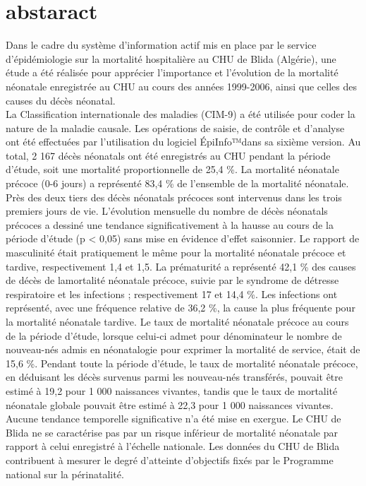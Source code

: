 
\section{abstaract}
Dans le cadre du système d’information actif mis
en place par le service d’épidémiologie sur la mortalité
hospitalière au CHU de Blida (Algérie), une étude a été
réalisée pour apprécier l’importance et l’évolution de la
mortalité néonatale enregistrée au CHU au cours des années
1999-2006, ainsi que celles des causes du décès néonatal.\\
La Classification internationale des maladies (CIM-9) a
été utilisée pour coder la nature de la maladie causale. Les
opérations de saisie, de contrôle et d’analyse ont été effectuées
par l’utilisation du logiciel ÉpiInfo™dans sa sixième version.
Au total, 2 167 décès néonatals ont été enregistrés au CHU
pendant la période d’étude, soit une mortalité proportionnelle
de 25,4 \%. La mortalité néonatale précoce (0-6 jours) a
représenté 83,4 \% de l’ensemble de la mortalité néonatale.
Près des deux tiers des décès néonatals précoces sont
intervenus dans les trois premiers jours de vie. L’évolution
mensuelle du nombre de décès néonatals précoces a dessiné
une tendance significativement à la hausse au cours de la
période d’étude (p < 0,05) sans mise en évidence d’effet
saisonnier. Le rapport de masculinité était pratiquement le
même pour la mortalité néonatale précoce et tardive, respectivement
1,4 et 1,5. La prématurité a représenté 42,1 \% des
causes de décès de lamortalité néonatale précoce, suivie par le
syndrome de détresse respiratoire et les infections ; respectivement
17 et 14,4 \%. Les infections ont représenté, avec une
fréquence relative de 36,2 \%, la cause la plus fréquente pour
la mortalité néonatale tardive. Le taux de mortalité néonatale
précoce au cours de la période d’étude, lorsque celui-ci admet
pour dénominateur le nombre de nouveau-nés admis en
néonatalogie pour exprimer la mortalité de service, était de
15,6 \%. Pendant toute la période d’étude, le taux de mortalité
néonatale précoce, en déduisant les décès survenus parmi
les nouveau-nés transférés, pouvait être estimé à 19,2 pour
1 000 naissances vivantes, tandis que le taux de mortalité
néonatale globale pouvait être estimé à 22,3 pour 1 000 naissances
vivantes. Aucune tendance temporelle significative n’a
été mise en exergue. Le CHU de Blida ne se caractérise pas par
un risque inférieur de mortalité néonatale par rapport à celui
enregistré à l’échelle nationale. Les données du CHU de Blida
contribuent à mesurer le degré d’atteinte d’objectifs fixés par
le Programme national sur la périnatalité.